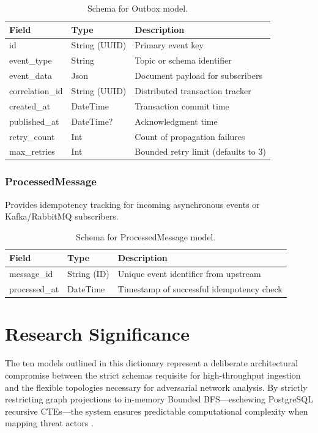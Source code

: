 \begin{table}[h]
\centering
\begin{tabular}{|l|l|l|}
\hline
\textbf{Field} & \textbf{Type} & \textbf{Description} \\
\hline
id & String (UUID) & Primary event key \\
event\_type & String & Topic or schema identifier \\
event\_data & Json & Document payload for subscribers \\
correlation\_id & String (UUID) & Distributed transaction tracker \\
created\_at & DateTime & Transaction commit time \\
published\_at & DateTime? & Acknowledgment time \\
retry\_count & Int & Count of propagation failures \\
max\_retries & Int & Bounded retry limit (defaults to 3) \\
\hline
\end{tabular}
\caption{Schema for Outbox model.}
\end{table}

\subsubsection{ProcessedMessage}
Provides idempotency tracking for incoming asynchronous events or Kafka/RabbitMQ subscribers.

\begin{table}[h]
\centering
\begin{tabular}{|l|l|l|}
\hline
\textbf{Field} & \textbf{Type} & \textbf{Description} \\
\hline
message\_id & String (ID) & Unique event identifier from upstream \\
processed\_at & DateTime & Timestamp of successful idempotency check \\
\hline
\end{tabular}
\caption{Schema for ProcessedMessage model.}
\end{table}

\section{Research Significance}
The ten models outlined in this dictionary represent a deliberate architectural compromise between the strict schemas requisite for high-throughput ingestion and the flexible topologies necessary for adversarial network analysis. By strictly restricting graph projections to in-memory Bounded BFS—eschewing PostgreSQL recursive CTEs—the system ensures predictable computational complexity when mapping threat actors \cite{graphs:newman2018}.
